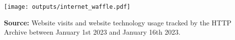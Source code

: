 \documentclass[border=0mm]{article}
\begin{document}
\begin{minipage}{0.45\textwidth}
    \vspace*{.2cm}

    \begin{rightframe}[width=1.03\textwidth,arc=10pt,auto outer arc]
    {\texttt{[image: outputs/internet\_waffle.pdf]}
    \newline

    {\small\linespread{.2}\selectfont \textbf{Source:} Website visits and
        website technology usage tracked by the HTTP Archive between January 1st 2023
        and January 16th 2023. \par} }
    \end{rightframe}
\end{minipage}
\end{document}
